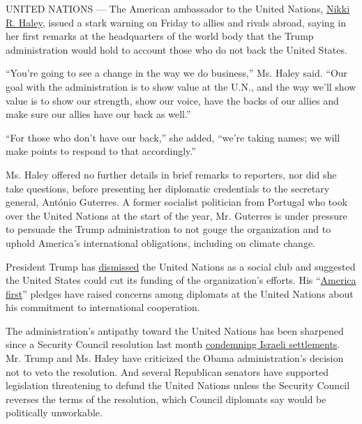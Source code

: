 UNITED NATIONS --- The American ambassador to the United Nations,
\href{https://www.nytimes.com/2016/11/23/us/politics/nikki-haley-donald-trump-un-ambassador.html}{Nikki
R. Haley}, issued a stark warning on Friday to allies and rivals abroad,
saying in her first remarks at the headquarters of the world body that
the Trump administration would hold to account those who do not back the
United States.

``You're going to see a change in the way we do business,'' Ms. Haley
said. ``Our goal with the administration is to show value at the U.N.,
and the way we'll show value is to show our strength, show our voice,
have the backs of our allies and make sure our allies have our back as
well.''

``For those who don't have our back,'' she added, ``we're taking names;
we will make points to respond to that accordingly.''

Ms. Haley offered no further details in brief remarks to reporters, nor
did she take questions, before presenting her diplomatic credentials to
the secretary general, António Guterres. A former socialist politician
from Portugal who took over the United Nations at the start of the year,
Mr. Guterres is under pressure to persuade the Trump administration to
not gouge the organization and to uphold America's international
obligations, including on climate change.

President Trump has
\href{https://www.nytimes.com/2017/01/04/world/americas/united-nations-donald-trump-antonio-guterres.html?_r=0}{dismissed}
the United Nations as a social club and suggested the United States
could cut its funding of the organization's efforts. His
``\href{https://www.nytimes.com/interactive/2017/01/20/us/politics/donald-trump-inauguration-speech-transcript.html}{America
first}'' pledges have raised concerns among diplomats at the United
Nations about his commitment to international cooperation.

The administration's antipathy toward the United Nations has been
sharpened since a Security Council resolution last month
\href{https://www.nytimes.com/2016/12/23/world/middleeast/israel-settlements-un-vote.html}{condemning
Israeli settlements}. Mr. Trump and Ms. Haley have criticized the Obama
administration's decision not to veto the resolution. And several
Republican senators have supported legislation threatening to defund the
United Nations unless the Security Council reverses the terms of the
resolution, which Council diplomats say would be politically unworkable.

